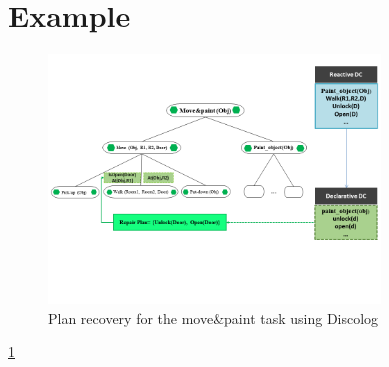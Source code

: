 \section{Example}
		\begin{figure}[!h]
			\centering
			\includegraphics[width=250pt]{Pictures/repair.png}
			\caption{\label{Plan recovery} Plan recovery for the move\&paint task using Discolog}
		\end{figure}
\ref*{Plan recovery}
%
%
%
%

